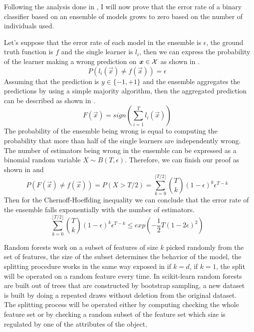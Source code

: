 \medskip

Following the analysis done in \cite{ZhouZhi-Hua2021ML}, I will now prove that the error rate of a
binary classifier based on an ensemble of models grows to zero based on the number of individuals
used.

Let's suppose that the error rate of each model in the ensemble is $\epsilon$, the ground truth
function is $f$ and the single learner is $l_i$, then we can express the probability of the learner
making a wrong prediction on $\boldsymbol{x} \in \mathcal{X}$ as shown in .
\begin{equation}
	\label{eq:error-rate}
	P(l_i(\vec{x}) \neq f(\vec{x})) = \epsilon
\end{equation}
Assuming that the prediction is $y \in \{-1, +1\}$ and the ensemble aggregates the predictions by
using a simple majority algorithm, then the aggregated prediction can be described as shown in
.
\begin{equation}
	\label{eq:ensemble-aggregation}
	F(\vec{x}) = sign\left(\sum_{i = 1}^{T}l_i(\vec{x})\right)
\end{equation}
The probability of the ensemble being wrong is equal to computing the probability that more than
half of the single learners are independently wrong. The number of estimators being wrong in the
ensemble can be expressed as a binomial random variable $X \sim B(T, \epsilon)$. Therefore, we can finish our proof as shown in  and 
\begin{equation}
	\label{eq:binomial}
	P(F(\vec{x}) \neq f(\vec{x})) = P(X > T / 2) = \sum_{k = 0}^{\lfloor T / 2 \rfloor}\binom{T}{k} (1 -
	\epsilon)^k\epsilon^{T - k}
\end{equation}
Then for the Chernoff-Hoeffding inequality we can conclude that the error rate of the ensemble falls
exponentially with the number of estimators.
\begin{equation}
	\label{eq:hoeffding}
	\sum_{k = 0}^{\lfloor T / 2 \rfloor}\binom{T}{k} (1 - \epsilon)^k\epsilon^{T - k} \leq
	exp\left(-\frac{1}{2}T(1 - 2\epsilon)^2\right)
\end{equation}

Random forests work on a subset of features of size $k$ picked randomly from the set of features,
the size of the subset determines the behavior of the model, the splitting procedure works in the
same way exposed in  if $k = d$, if $k = 1$, the split will be operated on a random
feature every time. In scikit-learn random forests are built out of trees that are constructed by
bootstrap sampling, a new dataset is built by doing a repeated draws without deletion from the
original dataset. The splitting process will be operated either by computing checking the whole
feature set or by checking a random subset of the feature set which size is regulated by one of the
attributes of the object.

